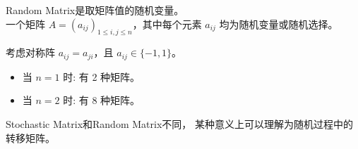 \theoremstyle{plain}\newtheorem*{1}{习题1}
\theoremstyle{plain}\newtheorem*{2}{习题2}
\theoremstyle{plain}\newtheorem*{3}{习题3}
\theoremstyle{plain}\newtheorem*{4}{习题4}
\theoremstyle{plain}\newtheorem*{5}{习题5}
\theoremstyle{plain}\newtheorem*{6}{习题6}
\theoremstyle{plain}\newtheorem*{7}{习题7}
\theoremstyle{plain}\newtheorem*{8}{习题8}
\theoremstyle{plain}\newtheorem*{9}{习题9}
\theoremstyle{plain}\newtheorem*{10}{习题10}
\def\E{\mathbb{E}}
\def\R{\mathbb{R}}
\def\N{\mathbb{N}}
\def\B{\mathcal{B}}
\def\M{\mathcal{M}}
\def\prob{\mathbb{P}}
\def\t{\underline{t}}
\def\c{\underline{c}}

\begin{definition}
Random Matrix是取矩阵值的随机变量。\\
一个矩阵 $A=(a_{ij})_{1\le i,j \le n}$，其中每个元素 $a_{ij}$ 均为随机变量或随机选择。
\end{definition}

\begin{example}[对称随机矩阵]
考虑对称阵 $a_{ij}=a_{ji}$，且 $a_{ij} \in \{-1, 1\}$。
\begin{itemize}
    \item 当 $n=1$ 时: 有 2 种矩阵。
    \item 当 $n=2$ 时: 有 8 种矩阵。
\end{itemize}
\end{example}

Stochastic Matrix和Random Matrix不同，
某种意义上可以理解为随机过程中的转移矩阵。


